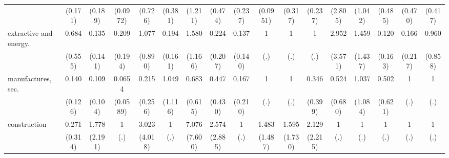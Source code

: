 {\begin{tabular}{l*{16}{c}}
                    &     (0.171)         &     (0.189)         &    (0.0972)         &     (0.726)         &     (0.381)         &     (1.211)         &     (0.474)         &     (0.237)         &    (0.0951)         &     (0.317)         &     (0.237)         &     (2.805)         &     (1.042)         &     (0.485)         &     (0.470)         &     (0.417)         \\
[1em]
extractive and energy.&       0.684         &       0.135         &       0.209         &       1.077         &       0.194\sym{*}  &       1.580         &       0.224         &       0.137         &           1         &           1         &           1         &       2.952         &       1.459         &       0.120         &       0.166         &       0.960         \\
                    &     (0.555)         &     (0.141)         &     (0.194)         &     (0.890)         &     (0.161)         &     (1.166)         &     (0.207)         &     (0.140)         &         (.)         &         (.)         &         (.)         &     (3.571)         &     (1.437)         &     (0.163)         &     (0.217)         &     (0.858)         \\
[1em]
manufactures, sec.  &       0.140\sym{*}  &       0.109\sym{*}  &      0.0654\sym{**} &       0.215         &       1.049         &       0.683         &       0.447         &       0.167         &           1         &           1         &       0.346         &       0.524         &       1.037         &       0.502         &           1         &           1         \\
                    &     (0.126)         &     (0.104)         &    (0.0589)         &     (0.256)         &     (1.116)         &     (0.615)         &     (0.430)         &     (0.210)         &         (.)         &         (.)         &     (0.399)         &     (0.680)         &     (1.084)         &     (0.621)         &         (.)         &         (.)         \\
[1em]
construction        &       0.271         &       1.778         &           1         &       3.023         &           1         &       7.076         &       2.574         &           1         &       1.483         &       1.595         &       2.129         &           1         &           1         &           1         &           1         &           1         \\
                    &     (0.314)         &     (2.191)         &         (.)         &     (4.018)         &         (.)         &     (7.600)         &     (2.885)         &         (.)         &     (1.487)         &     (1.730)         &     (2.215)         &         (.)         &         (.)         &         (.)         &         (.)         &         (.)         \\

\end{tabular}}
